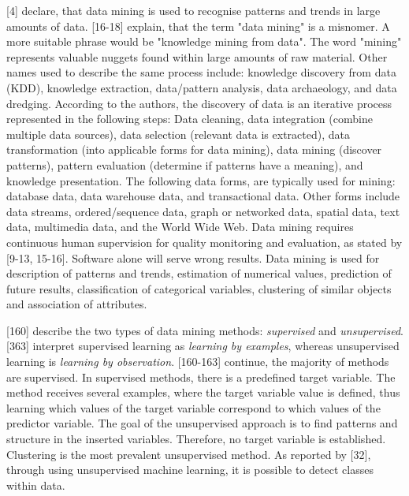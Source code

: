 \textcite{DataMiningAndPredictiveAnalytics}[4] declare, that data mining is used to recognise patterns and trends in large amounts of data. \textcite{han2011data}[16-18] explain, that the term "data mining" is a misnomer. A more suitable phrase would be "knowledge mining from data". The word "mining" represents valuable nuggets found within large amounts of raw material. Other names used to describe the same process include: knowledge discovery from data (KDD), knowledge extraction, data/pattern analysis, data archaeology, and data dredging.
According to the authors, the discovery of data is an iterative process represented in the following steps: Data cleaning, data integration (combine multiple data sources), data selection (relevant data is extracted), data transformation (into applicable forms for data mining), data mining (discover patterns), pattern evaluation (determine if patterns have a meaning), and knowledge presentation. The following data forms, are typically used for mining: database data, data warehouse data, and transactional data. Other forms include data streams, ordered/sequence data, graph or networked data, spatial data, text data, multimedia data, and the World Wide Web. Data mining requires continuous human supervision for quality monitoring and evaluation, as stated by \textcite{DataMiningAndPredictiveAnalytics}[9-13, 15-16]. Software alone will serve wrong results. Data mining is used for description of patterns and trends, estimation of numerical values, prediction of future results, classification of categorical variables, clustering of similar objects and association of attributes. 

\textcite{DataMiningAndPredictiveAnalytics}[160] describe the two types of data mining methods: \textit{supervised} and \textit{unsupervised}. \textcite{han2011data}[363] interpret supervised learning as \textit{learning by examples}, whereas unsupervised learning is \textit{learning by observation}. \textcite{DataMiningAndPredictiveAnalytics}[160-163] continue, the majority of methods are supervised. In supervised methods, there is a predefined target variable. The method receives several examples, where the target variable value is defined, thus learning which values of the target variable correspond to which values of the predictor variable. The goal of the unsupervised approach is to find patterns and structure in the inserted variables. Therefore, no target variable is established. Clustering is the most prevalent unsupervised method. As reported by \textcite{han2011data}[32], through using unsupervised machine learning, it is possible to detect classes within data.

